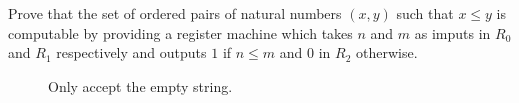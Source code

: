 \begin{problem}
  Prove that the set of ordered pairs of natural numbers $(x, y)$
  such that $x \leq y$ is computable by providing a register machine
  which takes $n$ and $m$ as imputs in $R_0$ and $R_1$ respectively
  and outputs $1$ if $n \leq m$ and $0$ in $R_2$ otherwise.

  \begin{answer}

    \begin{figure}[H]
      \centering
      \caption{Only accept the empty string.}
      \label{fig:empty}
    \end{figure}
  \end{answer}
\end{problem}
